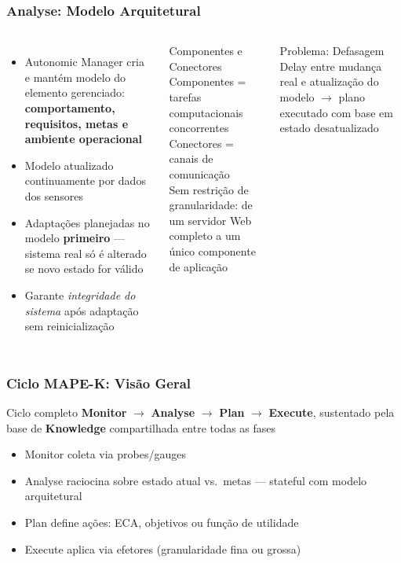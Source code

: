 \documentclass{beamer}
\begin{document}
  \begin{frame}
    \frametitle{Analyse: Modelo Arquitetural}
    \footnotesize
    \begin{columns}
      \begin{itemize}
        \item Autonomic Manager cria e mantém modelo do elemento gerenciado: \textbf{comportamento, requisitos, metas e ambiente operacional}
        \item Modelo atualizado continuamente por dados dos sensores
        \item Adaptações planejadas no modelo \textbf{primeiro} --- sistema real só é alterado se novo estado for válido
        \item Garante \textit{integridade do sistema} após adaptação sem reinicialização
      \end{itemize}
      \begin{block}{Componentes e Conectores}
        \footnotesize
        Componentes = tarefas computacionais concorrentes\\
        Conectores = canais de comunicação\\[0.15cm]
        Sem restrição de granularidade: de um servidor Web completo a um único componente de aplicação
      \end{block}
      \begin{alertblock}{Problema: Defasagem}
        \footnotesize
        Delay entre mudança real e atualização do modelo $\rightarrow$ plano executado com base em estado desatualizado
      \end{alertblock}
    \end{columns}
  \end{frame}

  \begin{frame}
    \frametitle{Ciclo MAPE-K: Visão Geral}
    \begin{block}{Ciclo completo}
      \textbf{Monitor} $\rightarrow$ \textbf{Analyse} $\rightarrow$ \textbf{Plan} $\rightarrow$ \textbf{Execute}, sustentado pela base de \textbf{Knowledge} compartilhada entre todas as fases
    \end{block}
    \vspace{0.2cm}
    \begin{itemize}
      \item Monitor coleta via probes/gauges
      \item Analyse raciocina sobre estado atual vs.\ metas --- stateful com modelo arquitetural
      \item Plan define ações: ECA, objetivos ou função de utilidade
      \item Execute aplica via efetores (granularidade fina ou grossa)
    \end{itemize}
  \end{frame}
\end{document}
